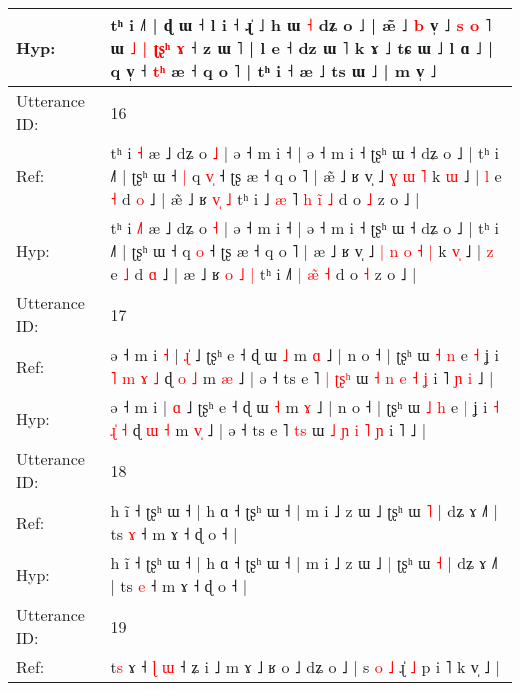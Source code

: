 \documentclass[10pt]{article}
\DeclareRobustCommand{\hl}[1]{{\textcolor{red}{#1}}}
\begin{document}
\begin{longtable}{ll}
 \\
Hyp: & tʰ i ˩˥ | ɖ ɯ ˧ l i ˧ ɻ̍ ˩ h ɯ \hl{˧} dʑ o ˩ | æ̃ ˩ \hl{b} v̩ ˩ \hl{}\hl{}\hl{s} \hl{o} ˥\hl{}\hl{}\hl{}\hl{}\hl{}\hl{} ɯ\hl{}\hl{}\hl{}\hl{}\hl{}\hl{}\hl{}\hl{}\hl{}\hl{} \hl{˩} \hl{|} \hl{ʈ}\hl{ʂ}\hl{ʰ} \hl{ɤ} ˧ \hl{}z ɯ ˥ | l e ˧ dz ɯ ˥ k \hl{}ɤ ˩ tɕ ɯ ˩ l ɑ ˩ | q v̩ ˧ \hl{t}\hl{ʰ} æ ˧ q o ˥ | tʰ i ˧ æ ˩ ts ɯ ˩ | m v̩ ˩
 \\
\midrule
Utterance ID: & 16 \\
Ref: & tʰ i \hl{}\hl{˧} æ ˩ dʑ o \hl{˩} | ə ˧ m i ˧ | ə ˧ m i ˧ ʈʂʰ ɯ ˧ dʑ o ˩ | tʰ i ˩˥ | ʈʂʰ ɯ ˧\hl{ }\hl{|} q \hl{v}\hl{̩} ˧ ʈʂ æ ˧ q o ˥ | æ\hl{̃} ˩ ʁ v̩ ˩\hl{}\hl{}\hl{}\hl{} \hl{ɣ} \hl{ɯ} \hl{˥} k \hl{}\hl{ɯ} ˩ | \hl{l} e \hl{˧} d \hl{o} ˩ | æ\hl{̃} ˩ ʁ \hl{}\hl{v}\hl{̩} \hl{˩} tʰ i ˩\hl{ }\hl{æ}\hl{ }˥ \hl{h} \hl{i}̃ \hl{˩} d o \hl{˩} z o ˩ |
 \\
Hyp: & tʰ i \hl{˩}\hl{˥} æ ˩ dʑ o \hl{˧} | ə ˧ m i ˧ | ə ˧ m i ˧ ʈʂʰ ɯ ˧ dʑ o ˩ | tʰ i ˩˥ | ʈʂʰ ɯ ˧\hl{}\hl{} q \hl{}\hl{o} ˧ ʈʂ æ ˧ q o ˥ | æ\hl{} ˩ ʁ v̩ ˩\hl{ }\hl{|}\hl{ }\hl{n} \hl{o} \hl{˧} \hl{|} k \hl{v}\hl{̩} ˩ | \hl{z} e \hl{˩} d \hl{ɑ} ˩ | æ\hl{} ˩ ʁ \hl{o}\hl{ }\hl{˩} \hl{|} tʰ i ˩\hl{}\hl{}\hl{}˥ \hl{|} \hl{æ}̃ \hl{˧} d o \hl{˧} z o ˩ |
 \\
\midrule
Utterance ID: & 17 \\
Ref: & ə ˧ m i\hl{ }\hl{˧} | \hl{ɻ}\hl{̍} ˩ ʈʂʰ e ˧ ɖ ɯ \hl{˩} m \hl{ɑ} ˩ | n o ˧ | ʈʂʰ ɯ \hl{˧} \hl{n} e \hl{˧} ʝ i \hl{˥} \hl{m}\hl{ }\hl{ɤ} \hl{˩} ɖ \hl{o} \hl{˩} m \hl{}\hl{æ} ˩ | ə ˧ ts e ˥\hl{ }\hl{|} \hl{ʈ}\hl{ʂ}\hl{ʰ} ɯ \hl{˧} \hl{n} \hl{e} \hl{˧} \hl{ʝ} i ˥\hl{ }\hl{ɲ}\hl{ }\hl{i} ˩ |
 \\
Hyp: & ə ˧ m i\hl{}\hl{} | \hl{}\hl{ɑ} ˩ ʈʂʰ e ˧ ɖ ɯ \hl{˧} m \hl{ɤ} ˩ | n o ˧ | ʈʂʰ ɯ \hl{˩} \hl{h} e \hl{|} ʝ i \hl{˧} \hl{}\hl{ɻ}\hl{̍} \hl{˧} ɖ \hl{ɯ} \hl{˧} m \hl{v}\hl{̩} ˩ | ə ˧ ts e ˥\hl{}\hl{} \hl{}\hl{t}\hl{s} ɯ \hl{˩} \hl{ɲ} \hl{i} \hl{˥} \hl{ɲ} i ˥\hl{}\hl{}\hl{}\hl{} ˩ |
 \\
\midrule
Utterance ID: & 18 \\
Ref: & h ĩ ˧ ʈʂʰ ɯ ˧ | h ɑ ˧ ʈʂʰ ɯ ˧ | m i ˩ z ɯ ˩\hl{}\hl{} ʈʂʰ ɯ \hl{˥} | dʑ ɤ ˩˥ | ts \hl{ɤ} ˧ m ɤ ˧ ɖ o ˧ |
 \\
Hyp: & h ĩ ˧ ʈʂʰ ɯ ˧ | h ɑ ˧ ʈʂʰ ɯ ˧ | m i ˩ z ɯ ˩\hl{ }\hl{|} ʈʂʰ ɯ \hl{˧} | dʑ ɤ ˩˥ | ts \hl{e} ˧ m ɤ ˧ ɖ o ˧ |
 \\
\midrule
Utterance ID: & 19 \\
Ref: & t\hl{s} ɤ ˧ \hl{ɭ} \hl{ɯ} ˧\hl{}\hl{} ʑ i ˩ m ɤ ˩ ʁ o ˩ dʑ o ˩ | s \hl{o} \hl{˩} ɻ̍ \hl{˩} p i ˥ k v̩ ˩ |
 \\

\end{longtable}
\end{document}
